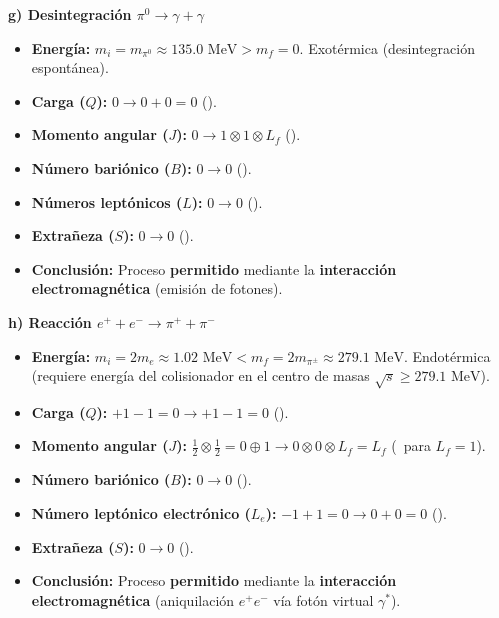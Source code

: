 \begin{problema}
\textbf{g) Desintegración $\pi^0 \to \gamma + \gamma$}
\begin{itemize}
    \item \textbf{Energía:} $m_i = m_{\pi^0} \approx 135.0 \text{ MeV} > m_f = 0$. Exotérmica (desintegración espontánea).
    \item \textbf{Carga ($Q$):} $0 \to 0 + 0 = 0$ (\checkmark).
    \item \textbf{Momento angular ($J$):} $0 \to 1 \otimes 1 \otimes L_f$ (\checkmark).
    \item \textbf{Número bariónico ($B$):} $0 \to 0$ (\checkmark).
    \item \textbf{Números leptónicos ($L$):} $0 \to 0$ (\checkmark).
    \item \textbf{Extrañeza ($S$):} $0 \to 0$ (\checkmark).
    \item \textbf{Conclusión:} Proceso \textbf{permitido} mediante la \textbf{interacción electromagnética} (emisión de fotones).
\end{itemize}

\textbf{h) Reacción $e^+ + e^- \to \pi^+ + \pi^-$}
\begin{itemize}
    \item \textbf{Energía:} $m_i = 2 m_e \approx 1.02 \text{ MeV} < m_f = 2 m_{\pi^\pm} \approx 279.1 \text{ MeV}$. Endotérmica (requiere energía del colisionador en el centro de masas $\sqrt{s} \ge 279.1 \text{ MeV}$).
    \item \textbf{Carga ($Q$):} $+1 - 1 = 0 \to +1 - 1 = 0$ (\checkmark).
    \item \textbf{Momento angular ($J$):} $\frac{1}{2} \otimes \frac{1}{2} = 0 \oplus 1 \to 0 \otimes 0 \otimes L_f = L_f$ (\checkmark\, para $L_f = 1$).
    \item \textbf{Número bariónico ($B$):} $0 \to 0$ (\checkmark).
    \item \textbf{Número leptónico electrónico ($L_e$):} $-1 + 1 = 0 \to 0 + 0 = 0$ (\checkmark).
    \item \textbf{Extrañeza ($S$):} $0 \to 0$ (\checkmark).
    \item \textbf{Conclusión:} Proceso \textbf{permitido} mediante la \textbf{interacción electromagnética} (aniquilación $e^+e^-$ vía fotón virtual $\gamma^*$).
\end{itemize}
\end{problema}


